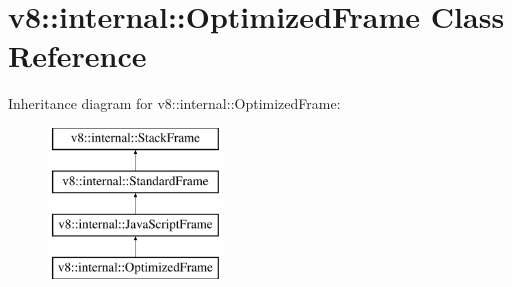 \hypertarget{classv8_1_1internal_1_1OptimizedFrame}{}\section{v8\+:\+:internal\+:\+:Optimized\+Frame Class Reference}
\label{classv8_1_1internal_1_1OptimizedFrame}
Inheritance diagram for v8\+:\+:internal\+:\+:Optimized\+Frame\+:\begin{figure}[H]
\begin{center}
\leavevmode
\includegraphics[height=4.000000cm]{classv8_1_1internal_1_1OptimizedFrame}
\end{center}
\end{figure}
